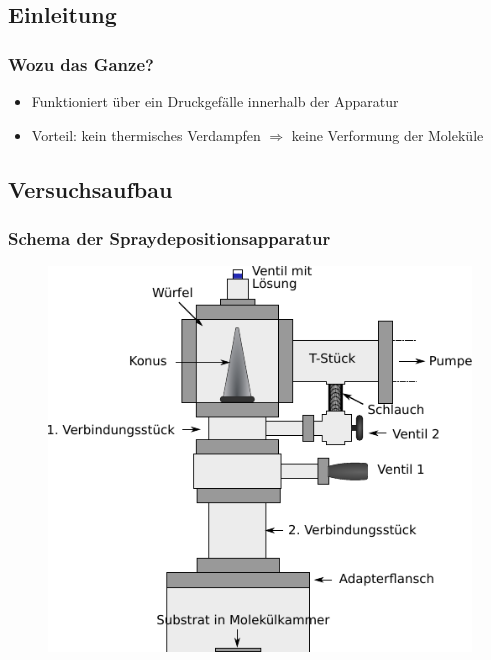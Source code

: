 \documentclass{beamer}
\begin{document}


\subsection[Motivation]{Einleitung}

\begin{frame}
\frametitle{Wozu das Ganze?}
\begin{itemize}\setlength{\itemsep}{+15pt}
  \item Funktioniert über ein Druckgefälle innerhalb der Apparatur
  \item Vorteil: kein thermisches Verdampfen $\Rightarrow$ keine Verformung der Moleküle
\end{itemize}
\end{frame}



\subsection[Versuchsaufbau]{Versuchsaufbau}

\begin{frame}
\frametitle{Schema der Spraydepositionsapparatur}
\begin{figure}[H]
\centering
\includegraphics{bilder/wuerfelklein.pdf}
\end{figure}
\end{frame}
\end{document}
